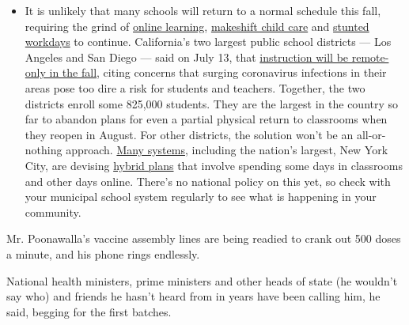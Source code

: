 \begin{itemize}
  \begin{itemize}
  \tightlist
  \item
    It is unlikely that many schools will return to a normal schedule
    this fall, requiring the grind of
    \href{https://www.nytimes.com/2020/06/05/us/coronavirus-education-lost-learning.html?action=click\&pgtype=Article\&state=default\&region=MAIN_CONTENT_3\&context=storylines_faq}{online
    learning},
    \href{https://www.nytimes.com/2020/05/29/us/coronavirus-child-care-centers.html?action=click\&pgtype=Article\&state=default\&region=MAIN_CONTENT_3\&context=storylines_faq}{makeshift
    child care} and
    \href{https://www.nytimes.com/2020/06/03/business/economy/coronavirus-working-women.html?action=click\&pgtype=Article\&state=default\&region=MAIN_CONTENT_3\&context=storylines_faq}{stunted
    workdays} to continue. California's two largest public school
    districts --- Los Angeles and San Diego --- said on July 13, that
    \href{https://www.nytimes.com/2020/07/13/us/lausd-san-diego-school-reopening.html?action=click\&pgtype=Article\&state=default\&region=MAIN_CONTENT_3\&context=storylines_faq}{instruction
    will be remote-only in the fall}, citing concerns that surging
    coronavirus infections in their areas pose too dire a risk for
    students and teachers. Together, the two districts enroll some
    825,000 students. They are the largest in the country so far to
    abandon plans for even a partial physical return to classrooms when
    they reopen in August. For other districts, the solution won't be an
    all-or-nothing approach.
    \href{https://bioethics.jhu.edu/research-and-outreach/projects/eschool-initiative/school-policy-tracker/}{Many
    systems}, including the nation's largest, New York City, are
    devising
    \href{https://www.nytimes.com/2020/06/26/us/coronavirus-schools-reopen-fall.html?action=click\&pgtype=Article\&state=default\&region=MAIN_CONTENT_3\&context=storylines_faq}{hybrid
    plans} that involve spending some days in classrooms and other days
    online. There's no national policy on this yet, so check with your
    municipal school system regularly to see what is happening in your
    community.
  \end{itemize}
\end{itemize}

Mr. Poonawalla's vaccine assembly lines are being readied to crank out
500 doses a minute, and his phone rings endlessly.

National health ministers, prime ministers and other heads of state (he
wouldn't say who) and friends he hasn't heard from in years have been
calling him, he said, begging for the first batches.


